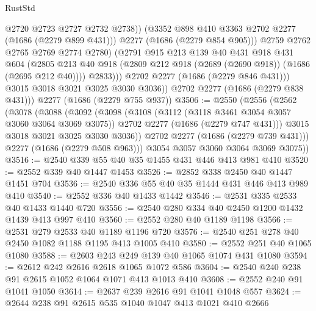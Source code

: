 \begin{lexlean}{RustStd}
\begin{coremodule}
                        @2720
                        @2723
                        @2727
                        @2732
                        @2738))
                    (@3352 @898 @410 @3363 @2702 @2277 (@1686 (@2279 @899 @431)))
                    @2277
                    (@1686 (@2279 @854 @905)))
                  @2759
                  @2762
                  @2765
                  @2769
                  @2774
                  @2780)
                (@2791
                  @915
                  @213
                  @139
                  @40
                  @431
                  @918
                  @431
                  @604
                  (@2805
                    @213
                    @40
                    @918
                    (@2809 @212 @918 (@2689 (@2690 @918)) (@1686 (@2695 @212 @40))))
                  @2833)))
            @2702
            @2277
            (@1686 (@2279 @846 @431)))
          @3015
          @3018
          @3021
          @3025
          @3030
          @3036))
      @2702
      @2277
      (@1686 (@2279 @838 @431)))
    @2277
    (@1686 (@2279 @755 @937))
@3506 := @2550
    (@2556
      (@2562
        (@3078
          (@3088
            (@3092
              (@3098
                (@3108
                  (@3112 (@3118 @3461 @3054 @3057 @3060 @3064 @3069 @3075))
                  @2702
                  @2277
                  (@1686 (@2279 @747 @431)))
                @3015
                @3018
                @3021
                @3025
                @3030
                @3036))
            @2702
            @2277
            (@1686 (@2279 @739 @431)))
          @2277
          (@1686 (@2279 @508 @963)))
        @3054
        @3057
        @3060
        @3064
        @3069
        @3075))
@3516 := @2540 @339 @55 @40 @35 @1455 @431 @446 @413 @981 @410
@3520 := @2552 @339 @40 @1447 @1453
@3526 := @2852 @338 @2450 @40 @1447 @1451 @704
@3536 := @2540 @336 @55 @40 @35 @1444 @431 @446 @413 @989 @410
@3540 := @2552 @336 @40 @1433 @1442
@3546 := @2531 @335 @2533 @40 @1433 @1440 @720
@3556 := @2540 @280 @334 @40 @2450 @1200 @1432 @1439 @413 @997 @410
@3560 := @2552 @280 @40 @1189 @1198
@3566 := @2531 @279 @2533 @40 @1189 @1196 @720
@3576 := @2540 @251 @278 @40 @2450 @1082 @1188 @1195 @413 @1005 @410
@3580 := @2552 @251 @40 @1065 @1080
@3588 := @2603 @243 @249 @139 @40 @1065 @1074 @431 @1080
@3594 := @2612 @242 @2616 @2618 @1065 @1072 @586
@3604 := @2540 @240 @238 @91 @2615 @1052 @1064 @1071 @413 @1013 @410
@3608 := @2552 @240 @91 @1041 @1050
@3614 := @2637 @239 @2616 @91 @1041 @1048 @557
@3624 := @2644 @238 @91 @2615 @535 @1040 @1047 @413 @1021 @410 @2666

\end{coremodule}
\end{lexlean}
